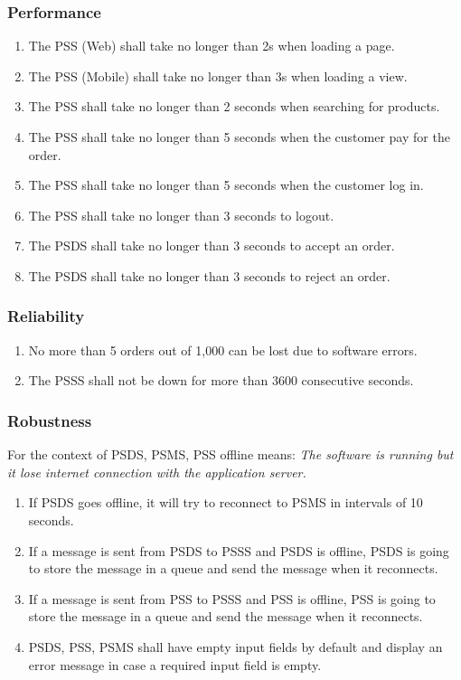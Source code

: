 \subsubsection{Performance}
\begin{enumerate}[label=PER-\arabic*]
    \item The PSS (Web) shall take no longer than 2s when loading a page.
    \item The PSS (Mobile) shall take no longer than 3s when loading a view. 
    \item The PSS shall take no longer than 2 seconds when searching for 
    products.
    \item The PSS shall take no longer than 5 seconds when the customer 
    pay for the order.
    \item The PSS shall take no longer than 5 seconds when the customer 
    log in.
    \item The PSS shall take no longer than 3 seconds to logout.
    \item The PSDS shall take no longer than 3 seconds to accept an order.
    \item The PSDS shall take no longer than 3 seconds to reject an order.
\end{enumerate}

\subsubsection{Reliability}
\begin{enumerate}[label=REL-\arabic*]
    \item No more than 5 orders out of 1,000 can be lost due to software errors.
    \item The PSSS shall not be down for more than 3600 consecutive seconds.
\end{enumerate}

\subsubsection{Robustness}
For the context of PSDS, PSMS, PSS offline means: \textit{The software is 
running but it lose internet connection with the application server.}

\begin{enumerate}[label=ROB-\arabic*]
    \item If PSDS goes offline, it will try to reconnect to PSMS in 
    intervals of 10 seconds.
    \item If a message is sent from PSDS to PSSS and PSDS is offline, PSDS is 
    going to store the message in a queue and send the message 
    when it reconnects.
    \item If a message is sent from PSS to PSSS and PSS is offline, PSS is 
    going to store the message in a queue and send the message 
    when it reconnects.
    \item PSDS, PSS, PSMS shall have empty input fields by default and display 
    an error message in case a required input field is empty.
\end{enumerate}

